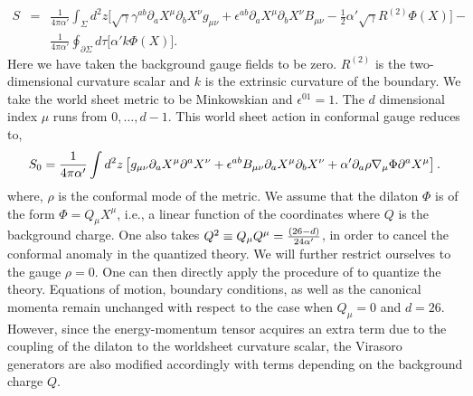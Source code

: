 \documentclass[a4paper,12pt]{article}
\begin{document}
\begin{eqnarray}
S & = & \frac{1}{4\pi\alpha'} \int_{\Sigma} d^2 z 
\big [{\sqrt \gamma}{\gamma}^{a b} 
\partial_{a}X^{\mu}\partial_{b}
X^{\nu} g_{\mu\nu} + \epsilon^{a b}\partial_{a}
X^{\mu}\partial_{b}X^{\nu} B_{\mu\nu} - \frac{1}{2}
\alpha'{\sqrt \gamma}R^{(2)}\Phi(X) \big ] - \nonumber \\
& & \frac{1}{4\pi\alpha'}\oint_{\partial\Sigma}d\tau 
\big [\alpha' k\Phi(X) \big ].
\end{eqnarray}
Here we have taken the background gauge fields to be zero. 
$R^{(2)}$ is the two-dimensional curvature scalar and $k$ is 
the extrinsic 
curvature of the boundary. We take the world sheet  metric 
to be Minkowskian and $\epsilon^{01} = 1$. The $d$ dimensional 
index $\mu$ runs from $0, \ldots, d-1$. This world sheet action 
in conformal gauge reduces to,
\begin{equation}
S_0 = {1\over 4 \pi \alpha'} \int d^2 z \left[  
g_{\mu \nu} \partial_a X^{\mu} \partial^a X^{\nu} 
+  \epsilon^{a b} B_{\mu \nu} \partial_a X^{\mu} \partial_b X^{\nu} 
+ {\alpha'} \partial_a \rho \nabla_{\mu} \Phi \partial^a X^{\mu}
\right].
\label{action1}
\end{equation}
where, $\rho$ is the conformal mode of the metric. We assume that 
the dilaton $\Phi$ is of the form
$\Phi = Q_{\mu} X^{\mu}$, i.e., a linear function of the 
coordinates where $Q$ is the background charge.  One also takes  
$Q^2 \equiv Q_{\mu} Q^{\mu} = {(26 - d)\over 24\alpha'}$, in order to 
cancel the conformal anomaly in the quantized theory. 
We will further restrict ourselves to the gauge $\rho = 0$.
One can then directly apply the
procedure of \cite{chu-ho} to quantize the theory. 
Equations of motion, boundary conditions, as well as the canonical 
momenta remain unchanged with respect to the case when 
$Q_{\mu}=0$ and $d=26$. However, since the energy-momentum tensor 
acquires an extra term due to the coupling of the dilaton to the 
worldsheet curvature scalar, the Virasoro generators are also 
modified accordingly with terms depending on the background charge 
$Q$. 
 
\end{document}
